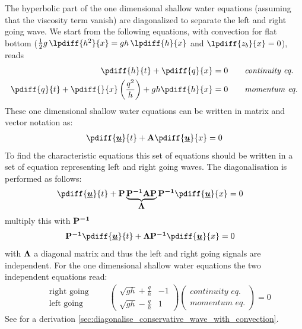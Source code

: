 The hyperbolic part of the one dimensional shallow water equations (assuming that the viscosity term vanish) are diagonalized to separate the left and right going wave.
We start from the following equations, with convection
for flat bottom ($\half g\, \lpdiff{h^2}{x} = gh\, \lpdiff{h}{x}$ and $\lpdiff{z_b}{x} = 0$), reads
%
\begin{align}
    \pdiff{h}{t}  + \pdiff{q}{x} & = 0 \qquad \textit{continuity eq.}  \label{eq:continuity_equation}\\
    \pdiff{q}{t}  + \pdiff{}{x} \left( \frac{q^2}{h} \right) + g h \pdiff{h}{x} & = 0 \qquad \textit{momentum eq.}
    \label{eq:momentum_equation}
\end{align}
These one dimensional shallow water equations can be written in matrix and vector notation as:
\begin{align}
    \pdiff{\vec{u}}{t} + \mat{A} \pdiff{\vec{u}}{x} = 0
\end{align}
To find the characteristic equations this set of equations should be written in a set of equation representing left and right going waves.
The diagonalisation is performed as follows:
\begin{align}
    &\pdiff{\vec{u}}{t} + \mat{P}\underbrace{\mat{P^{-1}}\mat{A}\mat{P}}_{\mat{\Lambda}}\mat{P^{-1}} \pdiff{\vec{u}}{x} = 0
\end{align}
multiply this with $\mbox{\boldmath ${\mathrm{P^{-1}}}$}$
\begin{align}
    &\mat{P^{-1}}\pdiff{\vec{u}}{t} + \mat{\Lambda}\mat{P^{-1}} \pdiff{\vec{u}}{x} = 0
\end{align}
with $\mbox{\boldmath ${\mathrm{\Lambda}}$}$ a diagonal matrix and thus the left and right going signals are independent.
For the one dimensional shallow water equations the two independent equations read:
\begin{align}
    \begin{matrix}
        \quad \text{right going} \\
        \quad \text{left going}
    \end{matrix}
    \qquad
    \begin{pmatrix}
        \sqrt{gh} + \frac{q}{h}  &  -1 \\
        \sqrt{gh} - \frac{q}{h}  &  1
    \end{pmatrix}
    \begin{pmatrix} \textit{continuity eq.} \\ \textit{momentum eq.} \end{pmatrix}    = 0
    \label{eq:left_right_going_equations}
\end{align}
See for a derivation \autoref{sec:diagonalise_conservative_wave_with_convection}.

